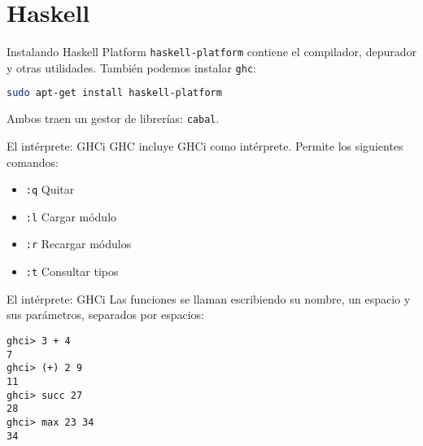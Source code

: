 \section{Haskell}

\begin{frame}[fragile]{Instalando Haskell Platform}
  \texttt{haskell-platform} contiene el compilador, depurador y otras utilidades.
  También podemos instalar \texttt{ghc}:
  \espacio
  \begin{lstlisting}[language=bash]
sudo apt-get install haskell-platform
  \end{lstlisting}
  \espacio
  Ambos traen un gestor de librerías: \texttt{cabal}.

\end{frame}

\begin{frame}{El intérprete: GHCi}
  GHC incluye GHCi como intérprete. Permite los siguientes comandos:
  \espacio
  \begin{itemize}
    \item \texttt{:q} \qquad  Quitar
    \item \texttt{:l} \qquad  Cargar módulo
    \item \texttt{:r} \qquad  Recargar módulos
    \item \texttt{:t} \qquad  Consultar tipos
  \end{itemize}

\end{frame}

\begin{frame}[fragile]{El intérprete: GHCi}
 Las funciones se llaman escribiendo su nombre, un espacio y sus parámetros, separados por espacios:
\espacio
  \begin{lstlisting}
ghci> 3 + 4
7
ghci> (+) 2 9
11
ghci> succ 27
28
ghci> max 23 34
34
  \end{lstlisting}

\end{frame}



